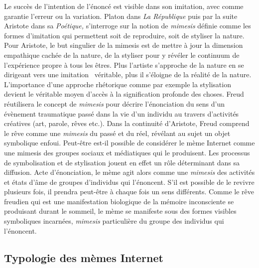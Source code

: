 Le succ\`es de l{\textquoteright}intention de l{\textquoteright}\'enonc\'e est visible dans son imitation, avec comme garantie l{\textquoteright}erreur ou la variation. Platon dans \textit{La R\'epublique} puis par la suite Aristote dans sa \textit{Po\'etique,} s{\textquoteright}interroge sur la notion de \textit{mimesis} d\'efinie comme les formes d{\textquoteright}imitation qui permettent soit de reproduire, soit de styliser la nature. Pour Aristote, le but singulier de la mimesis est de mettre \`a jour la dimension empathique cach\'ee de la nature, de la styliser pour y r\'ev\'eler le continuum de l{\textquoteright}exp\'erience propre \`a tous les \^etres. Plus l{\textquoteright}artiste s{\textquoteright}approche de la nature en se dirigeant vers une imitation {\guillemotleft}~v\'eritable{\guillemotright}, plus il s{\textquoteright}\'eloigne de la r\'ealit\'e de la nature. L{\textquoteright}importance d{\textquoteright}une approche rh\'etorique comme par exemple la stylisation devient le v\'eritable moyen d{\textquoteright}acc\`es \`a la signification profonde des choses. Freud r\'eutilisera le concept de \textit{mimesis} pour d\'ecrire l{\textquoteright}\'enonciation du sens d{\textquoteright}un \'ev\`enement traumatique pass\'e dans la vie d{\textquoteright}un individu au travers d{\textquoteright}activit\'es cr\'eatives (art, parole, r\^eves etc.). Dans la continuit\'e d{\textquoteright}Aristote, Freud comprend le r\^eve comme une \textit{mimesis} du pass\'e et du r\'eel, r\'ev\'elant au sujet un objet symbolique enfoui. Peut-\^etre est-il possible de consid\'erer le m\`eme Internet comme une mimesis des groupes sociaux et m\'ediatiques qui le produisent. Les processus de symbolisation et de stylisation jouent en effet un r\^ole d\'eterminant dans sa diffusion. Acte d{\textquoteright}\'enonciation, le m\`eme agit alors comme une \textit{mimesis} des activit\'es et \'etats d{\textquoteright}\^ame de groupes d{\textquoteright}individus qui l{\textquoteright}\'enoncent. S{\textquoteright}il est possible de le revivre plusieurs fois, il prendra peut-\^etre \`a chaque fois un sens diff\'erents. Comme le r\^eve freudien qui est une manifestation biologique de la m\'emoire inconsciente se produisant durant le sommeil, le m\`eme se manifeste sous des formes visibles symboliques incarn\'ees, \textit{mimesis} particuli\`ere du groupe des individus qui l{\textquoteright}\'enoncent. 


\subsection[Typologie des m\`emes Internet]{Typologie des m\`emes Internet}

